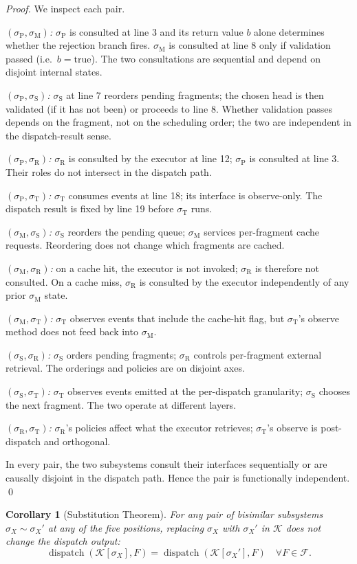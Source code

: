 \documentclass[twocolumn,11pt,a4paper]{article}
\newtheorem{corollary}[theorem]{Corollary}
\DeclareMathOperator{\dispatch}{dispatch}
\newcommand{\Kernel}{\mathcal{K}}
\newcommand{\Frag}{F}
\newcommand{\Sub}{\sigma}
\newcommand{\Pve}{\Sub_{\mathrm{P}}}
\newcommand{\Cmm}{\Sub_{\mathrm{M}}}
\newcommand{\Pss}{\Sub_{\mathrm{S}}}
\newcommand{\Dic}{\Sub_{\mathrm{R}}}
\newcommand{\Tem}{\Sub_{\mathrm{T}}}
\newcommand{\bisim}{\sim}
\begin{document}
\begin{proof}
We inspect each pair.

\emph{$(\Pve, \Cmm)$:} $\Pve$ is consulted at line 3 and its return value $b$ alone determines whether the rejection branch fires. $\Cmm$ is consulted at line 8 only if validation passed (i.e.\ $b = \mathrm{true}$). The two consultations are sequential and depend on disjoint internal states.

\emph{$(\Pve, \Pss)$:} $\Pss$ at line 7 reorders pending fragments; the chosen head is then validated (if it has not been) or proceeds to line 8. Whether validation passes depends on the fragment, not on the scheduling order; the two are independent in the dispatch-result sense.

\emph{$(\Pve, \Dic)$:} $\Dic$ is consulted by the executor at line 12; $\Pve$ is consulted at line 3. Their roles do not intersect in the dispatch path.

\emph{$(\Pve, \Tem)$:} $\Tem$ consumes events at line 18; its interface is observe-only. The dispatch result is fixed by line 19 before $\Tem$ runs.

\emph{$(\Cmm, \Pss)$:} $\Pss$ reorders the pending queue; $\Cmm$ services per-fragment cache requests. Reordering does not change which fragments are cached.

\emph{$(\Cmm, \Dic)$:} on a cache hit, the executor is not invoked; $\Dic$ is therefore not consulted. On a cache miss, $\Dic$ is consulted by the executor independently of any prior $\Cmm$ state.

\emph{$(\Cmm, \Tem)$:} $\Tem$ observes events that include the cache-hit flag, but $\Tem$'s observe method does not feed back into $\Cmm$.

\emph{$(\Pss, \Dic)$:} $\Pss$ orders pending fragments; $\Dic$ controls per-fragment external retrieval. The orderings and policies are on disjoint axes.

\emph{$(\Pss, \Tem)$:} $\Tem$ observes events emitted at the per-dispatch granularity; $\Pss$ chooses the next fragment. The two operate at different layers.

\emph{$(\Dic, \Tem)$:} $\Dic$'s policies affect what the executor retrieves; $\Tem$'s observe is post-dispatch and orthogonal.

In every pair, the two subsystems consult their interfaces sequentially or are causally disjoint in the dispatch path. Hence the pair is functionally independent. \qed
\end{proof}

\begin{corollary}[Substitution Theorem]
\label{cor:substitution}
For any pair of bisimilar subsystems $\Sub_X \bisim \Sub_X'$ at any of the five positions, replacing $\Sub_X$ with $\Sub_X'$ in $\Kernel$ does not change the dispatch output:
\[
\dispatch(\Kernel[\Sub_X], \Frag) = \dispatch(\Kernel[\Sub_X'], \Frag) \quad \forall \Frag \in \mathcal{F}.
\]
\end{corollary}
\end{document}
